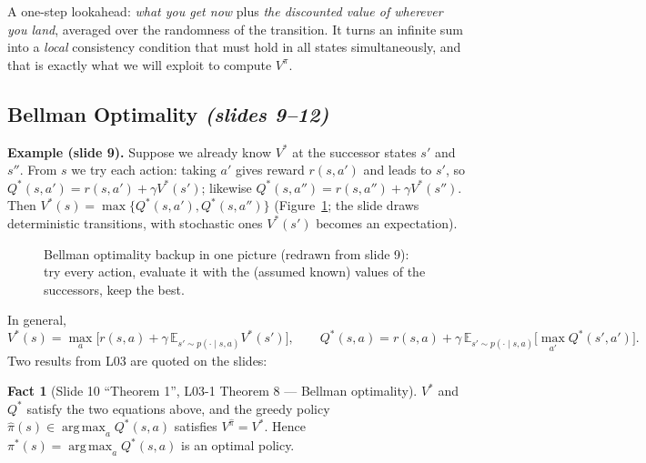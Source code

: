 \documentclass[11pt,a4paper]{article}
\newcommand{\E}{\mathbb{E}}
\DeclareMathOperator*{\argmax}{arg\,max}
\newcommand{\slides}[1]{\texorpdfstring{\emph{(slides #1)}}{(slides #1)}}
\theoremstyle{plain}
\theoremstyle{definition}
\newtheorem{fact}{Fact}\renewcommand{\thefact}{F\arabic{fact}}
\theoremstyle{remark}
\newcommand{\figref}[1]{Figure~\ref{#1}}
\begin{document}
\begin{intuition}
A one-step lookahead: \emph{what you get now} plus \emph{the discounted value of wherever you land}, averaged over the randomness of the transition. It turns an infinite sum into a \emph{local} consistency condition that must hold in all states simultaneously, and that is exactly what we will exploit to compute $V^\pi$.
\end{intuition}

\subsection{Bellman Optimality \slides{9--12}}
\textbf{Example (slide 9).} Suppose we already know $V^*$ at the successor states $s'$ and $s''$. From $s$ we try each action: taking $a'$ gives reward $r(s,a')$ and leads to $s'$, so $Q^*(s,a')=r(s,a')+\gamma V^*(s')$; likewise $Q^*(s,a'')=r(s,a'')+\gamma V^*(s'')$. Then $V^*(s)=\max\{Q^*(s,a'),Q^*(s,a'')\}$ (\figref{fig:tree}; the slide draws deterministic transitions, with stochastic ones $V^*(s')$ becomes an expectation).

\begin{figure}[htbp]
\centering
{}
\caption{Bellman optimality backup in one picture (redrawn from slide 9): try every action, evaluate it with the (assumed known) values of the successors, keep the best.}
\label{fig:tree}
\end{figure}

In general,
\[
V^*(s)=\max_a\Big[r(s,a)+\gamma\,\E_{s'\sim p(\cdot\mid s,a)}V^*(s')\Big],\qquad
Q^*(s,a)=r(s,a)+\gamma\,\E_{s'\sim p(\cdot\mid s,a)}\Big[\max_{a'}Q^*(s',a')\Big].
\]
Two results from L03 are quoted on the slides:

\begin{fact}[Slide 10 ``Theorem 1'', L03-1 Theorem 8 --- Bellman optimality]\label{fact:bopt}
$V^*$ and $Q^*$ satisfy the two equations above, and the greedy policy $\hat\pi(s)\in\argmax_aQ^*(s,a)$ satisfies $V^{\hat\pi}=V^*$. Hence $\pi^*(s)=\argmax_aQ^*(s,a)$ is an optimal policy.
\end{fact}
\end{document}
